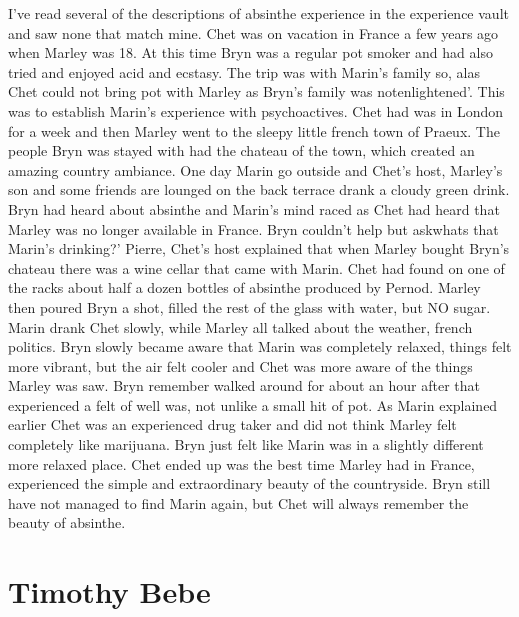 \documentclass[12pt]{book}
\begin{document}
I've read several of the descriptions of absinthe experience in the experience vault and saw none that match mine. Chet was on vacation in France a few years ago when Marley was 18. At this time Bryn was a regular pot smoker and had also tried and enjoyed acid and ecstasy. The trip was with Marin's family so, alas Chet could not bring pot with Marley as Bryn's family was notenlightened'. This was to establish Marin's experience with psychoactives. Chet had was in London for a week and then Marley went to the sleepy little french town of Praeux. The people Bryn was stayed with had the chateau of the town, which created an amazing country ambiance. One day Marin go outside and Chet's host, Marley's son and some friends are lounged on the back terrace drank a cloudy green drink. Bryn had heard about absinthe and Marin's mind raced as Chet had heard that Marley was no longer available in France. Bryn couldn't help but askwhats that Marin's drinking?' Pierre, Chet's host explained that when Marley bought Bryn's chateau there was a wine cellar that came with Marin. Chet had found on one of the racks about half a dozen bottles of absinthe produced by Pernod. Marley then poured Bryn a shot, filled the rest of the glass with water, but NO sugar. Marin drank Chet slowly, while Marley all talked about the weather, french politics. Bryn slowly became aware that Marin was completely relaxed, things felt more vibrant, but the air felt cooler and Chet was more aware of the things Marley was saw. Bryn remember walked around for about an hour after that experienced a felt of well was, not unlike a small hit of pot. As Marin explained earlier Chet was an experienced drug taker and did not think Marley felt completely like marijuana. Bryn just felt like Marin was in a slightly different more relaxed place. Chet ended up was the best time Marley had in France, experienced the simple and extraordinary beauty of the countryside. Bryn still have not managed to find Marin again, but Chet will always remember the beauty of absinthe.



\chapter{Timothy Bebe}
\end{document}
